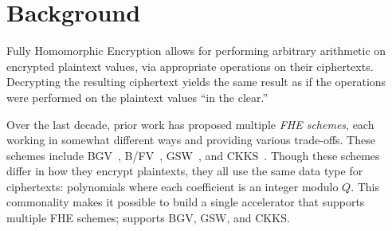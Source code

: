 \chapter{Background}\label{sec:background}







Fully Homomorphic Encryption allows for performing arbitrary
arithmetic on encrypted plaintext values, via appropriate operations
on their ciphertexts. Decrypting the resulting ciphertext yields the
same result as if the operations were performed on the plaintext
values ``in the clear.''

Over the last decade, prior work has proposed multiple \emph{FHE schemes},
each working in somewhat different ways and providing various trade-offs.
These schemes include BGV~\cite{brakerski:toct14:leveled},
B/FV~\cite{brakerski:crypto12:fully,fan:iacr12:somewhat},
GSW~\cite{gentry:crypto13:homomorphic}, and CKKS~\cite{cheon:ictaci17:homomorphic}.
Though these schemes differ in how they encrypt plaintexts, they all
use the same data type for ciphertexts:
polynomials where each coefficient is an integer modulo $Q$.
This commonality makes it possible to build a single accelerator that supports multiple FHE schemes;
\name supports BGV, GSW, and CKKS.

